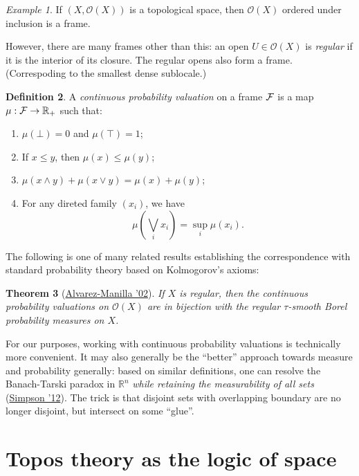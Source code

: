\documentclass[11pt, oneside, article]{memoir}
\theoremstyle{plain}
\newtheorem{theorem}{Theorem}[chapter] %
\theoremstyle{definition}
\newtheorem{definition}[theorem]{Definition}
\theoremstyle{remark}
\newtheorem{example}[theorem]{Example}
\begin{document}
\newcommand{\Open}[1]{\mathcal{O}(#1)}

\begin{example}
If $(X,\Open{X})$ is a topological space, then $\Open{X}$ ordered under inclusion is a frame.
\end{example}

However, there are many frames other than this: an open $U\in\Open{X}$ is \emph{regular} if it is the interior of its closure. The regular opens also form a frame. (Correspoding to the smallest dense sublocale.)

\newcommand{\R}{\mathbb{R}}

\begin{definition}
A \emph{continuous probability valuation} on a frame $\mathcal{F}$ is a map $\mu : \Frame \to \R_+$ such that:
\begin{enumerate}
\item $\mu(\bot) = 0$ and $\mu(\top) = 1$;
\item If $x\leq y$, then $\mu(x) \leq \mu(y)$;
\item $\mu(x \land y) + \mu(x \lor y) = \mu(x) + \mu(y)$;
\item For any direted family $(x_i)$, we have
\[
	\mu\left( \bigvee_i x_i \right) = \sup_i \mu(x_i).
\]
\end{enumerate}
\end{definition}

The following is one of many related results establishing the correspondence with standard probability theory based on Kolmogorov's axioms:

\begin{theorem}[\href{https://www.sciencedirect.com/science/article/pii/S0166864101002498}{Alvarez-Manilla '02}]
If $X$ is regular, then the continuous probability valuations on $\Open{X}$ are in bijection with the regular $\tau$-smooth Borel probability measures on $X$.
\end{theorem}

For our purposes, working with continuous probability valuations is technically more convenient. It may also generally be the ``better'' approach towards measure and probability generally: based on similar definitions, one can resolve the Banach-Tarski paradox in $\R^n$ \emph{while retaining the measurability of all sets} (\href{https://www.sciencedirect.com/science/article/pii/S0168007211001874}{Simpson '12}). The trick is that disjoint sets with overlapping boundary are no longer disjoint, but intersect on some ``glue''.

\chapter{Topos theory as the logic of space}
\end{document}
